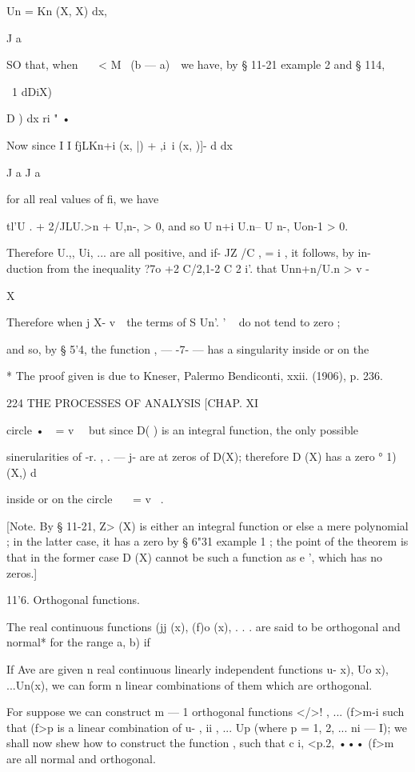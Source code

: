 {Un = Kn (X, X) dx, 

J a 

SO that, when \ \ \ <  M~  (b — a)~\ we have, by § 11-21 example 2 and § 114, 

\  1 dDiX)  

D  )  dx  ri " • 

Now since I I  fjLKn+i (x, |) +  ,i\ i (x,  )]- d dx   

J a J a 

for all real values of fi, we have 

tl'U . + 2/JLU.>n + U,n-, > 0, 
and so U n+i U.n--   U n-, Uon-1 > 0. 

Therefore U.,, Ui, ... are all positive, and if- JZ /C , = i , it follows, by in- 
duction from the inequality ?7o +2 C/2,1-2   C 2 i'. that Unn+n/U.n > v - 

X 

Therefore when j X-   v~\ the terms of S Un'. ' ~  do not tend to zero ; 

and so, by § 5'4, the function   , — -7-  — has a singularity inside or on the 

* The proof given is due to Kneser, Palermo Bendiconti, xxii. (1906), p. 236. 



224 THE PROCESSES OF ANALYSIS [CHAP. XI 

circle •\ \   = v~ \ but since D( )  is an integral function, the only possible 

sinerularities of -r. , . — j-  are at zeros of D(X); therefore D (X) has a zero 
° 1) (X,) d\ 

inside or on the circle \ \ \ = v~  . 

[Note. By § 11-21, Z> (X) is either an integral function or else a mere polynomial ; in 
the latter case, it has a zero by § 6"31 example 1 ; the point of the theorem is that in 
the former case D (X) cannot be such a function as e ', which has no zeros.] 

11'6. Orthogonal functions. 

The real continuous functions (jj  (x), (f)o (x), . . . are said to be orthogonal 
and normal* for the range  a, b) if 

If Ave are given n real continuous linearly independent functions 
u-  x), Uo x), ...Un(x), we can form n linear combinations of them which 
are orthogonal. 

For suppose we can construct m — 1 orthogonal functions </>! , ... (f>m-i such 
that (f>p is a linear combination of u- , ii , ... Up (where p = 1, 2, ... ni — I); 
we shall now shew how to construct the function  ,  such that c i, <p.2, ••• (f>m 
are all normal and orthogonal. 

}
